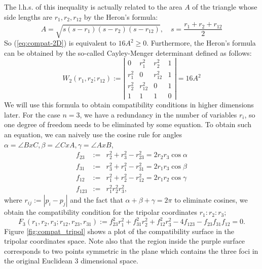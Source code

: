\documentclass{article}
\begin{document}
The l.h.s. of this inequality is actually related to the area \(A\) of the triangle whose side lengths are \(r_{1},r_{2},r_{12}\) by the Heron's formula:
\begin{equation}
A = \sqrt{s(s - r_{1})(s-r_{2})(s-r_{12})}, \quad s=\frac{r_1 + r_2 + r_{12}}{2}
\end{equation}
So (\ref{eq:compat-2D}) is equivalent to \(16A^{2} \ge 0\). Furthermore, the Heron's formula can be obtained by the so-called Cayley-Menger determinant defined as follows:
\begin{equation}
\label{}
W_2(r_1,r_2;r_{12}) :=   \left|
\begin{array}{cccc}
0 &  r_1^2 & r_2^2 & 1 \\
r_1^2 & 0 & r_{12}^2 & 1\\
r_2^2 & r_{12}^2 & 0 & 1 \\
1 & 1 & 1 & 0
\end{array}\right| = 16A^{2}
\end{equation}
We will use this formula to obtain compatibility conditions in higher dimensions later.
For the case \(n=3\), we have a redundancy in the number of variables \(r_{i}\), so one degree of freedom needs to be eliminated by some equation.
To obtain such an equation, we can naively use the cosine rule for angles \(\alpha = \angle BxC, \beta =\angle CxA, \gamma = \angle AxB\), 
\begin{eqnarray}
f_{23} & := & r_2^2 + r_3^2 - r_{23}^2 = 2r_2r_3\cos{\alpha}\\
f_{31} & := & r_3^2 + r_1^2 - r_{31}^2 = 2r_1r_3\cos{\beta}\\
f_{12} & := & r_1^2 + r_2^2 - r_{12}^2 = 2r_1r_2\cos{\gamma}\\
f_{123} & := & r_1^2 r_2^2 r_3^2,
\end{eqnarray}
where \(r_{ij}:=|p_i-p_j|\) and the fact that \(\alpha + \beta + \gamma = 2\pi\) to eliminate cosines, we obtain the compatibility condition for the tripolar coordinates \(r_{1}:r_{2}:r_{3}\);
\begin{equation}
\label{eq:tri_compat}
F_3(r_1,r_2,r_3;r_{12},r_{23},r_{31}) := f_{23}^2 r_1^2 + f_{31}^2 r_2^2 + f_{12}^2 r_3^2 - 4 f_{123} - f_{23} f_{31} f_{12} = 0.
\end{equation}
Figure \ref{fig:compat_tripol} shows a plot of the compatibility surface in the tripolar coordinates space. Note also that the region inside the purple surface corresponds to two points symmetric in the plane which contains the three foci in the original Euclidean 3 dimensional space. \\
\end{document}
